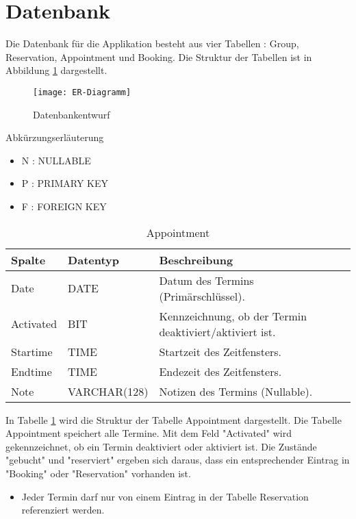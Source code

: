 \documentclass[10pt,a4paper]{article}
\begin{document}
\section{Datenbank}
Die Datenbank für die Applikation besteht aus vier Tabellen : Group, Reservation, Appointment und Booking.
Die Struktur der Tabellen ist in Abbildung \ref{fig:ER-Diagramm} dargestellt.

\begin{figure}[ht]		
	\centering
	\texttt{[image: ER-Diagramm]}
	\caption{Datenbankentwurf}
	\label{fig:ER-Diagramm}	
\end{figure}

Abkürzungserläuterung
\begin{itemize}
\item N : NULLABLE
\item P : PRIMARY KEY
\item F : FOREIGN KEY
\end{itemize}

\begin{table}[h]
	\centering
	\caption{Appointment}
	\label{tab:Appointment}   
    \begin{tabular}{| l | l | l | l |}
    \hline
    \rowcolor{lightgray} Spalte & Datentyp & Beschreibung  \\ \hline
    Date  & DATE & Datum des Termins (Primärschlüssel).\\ \hline
    Activated & BIT & Kennzeichnung, ob der Termin deaktiviert/aktiviert ist.\\ \hline
    Startime & TIME & Startzeit des Zeitfensters. \\ \hline
    Endtime & TIME & Endezeit des Zeitfensters.  \\ \hline
    Note & VARCHAR(128) & Notizen des Termins (Nullable). \\ \hline
    \end{tabular}
\end{table}

In Tabelle \ref{tab:Appointment} wird die Struktur der Tabelle Appointment dargestellt. Die Tabelle Appointment speichert alle Termine. Mit dem Feld "Activated" wird gekennzeichnet, ob ein Termin deaktiviert oder aktiviert ist. Die Zustände "gebucht" und "reserviert" ergeben sich daraus, dass ein entsprechender Eintrag in "Booking" oder "Reservation" vorhanden ist.
\begin{itemize}
	\item Jeder Termin darf nur von einem Eintrag in der Tabelle Reservation referenziert werden. 
\end{itemize}
\end{document}
